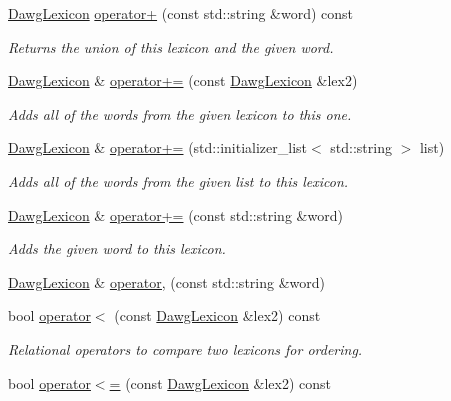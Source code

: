 \begin{DoxyCompactItemize}
\mbox{\hyperlink{classDawgLexicon}{Dawg\+Lexicon}} \mbox{\hyperlink{classDawgLexicon_a218cb40b0674a3db9a362e5b878f7bce}{operator+}} (const std\+::string \&word) const
\begin{DoxyCompactList}\small\item\em Returns the union of this lexicon and the given word. \end{DoxyCompactList}\item 
\mbox{\hyperlink{classDawgLexicon}{Dawg\+Lexicon}} \& \mbox{\hyperlink{classDawgLexicon_a4f69eb7a84edf9a91861e7083305e501}{operator+=}} (const \mbox{\hyperlink{classDawgLexicon}{Dawg\+Lexicon}} \&lex2)
\begin{DoxyCompactList}\small\item\em Adds all of the words from the given lexicon to this one. \end{DoxyCompactList}\item 
\mbox{\hyperlink{classDawgLexicon}{Dawg\+Lexicon}} \& \mbox{\hyperlink{classDawgLexicon_a30565b5b4fdd5efeb9c11fb1943a1d90}{operator+=}} (std\+::initializer\+\_\+list$<$ std\+::string $>$ list)
\begin{DoxyCompactList}\small\item\em Adds all of the words from the given list to this lexicon. \end{DoxyCompactList}\item 
\mbox{\hyperlink{classDawgLexicon}{Dawg\+Lexicon}} \& \mbox{\hyperlink{classDawgLexicon_a8d7fe415402649e86e5ccbb3738d358e}{operator+=}} (const std\+::string \&word)
\begin{DoxyCompactList}\small\item\em Adds the given word to this lexicon. \end{DoxyCompactList}\item 
\mbox{\hyperlink{classDawgLexicon}{Dawg\+Lexicon}} \& \mbox{\hyperlink{classDawgLexicon_ad749b5a8bca43259350ee643e152c2d8}{operator,}} (const std\+::string \&word)
\item 
bool \mbox{\hyperlink{classDawgLexicon_aa7c66db17666a22697ec8076716c3680}{operator$<$}} (const \mbox{\hyperlink{classDawgLexicon}{Dawg\+Lexicon}} \&lex2) const
\begin{DoxyCompactList}\small\item\em Relational operators to compare two lexicons for ordering. \end{DoxyCompactList}\item 
bool \mbox{\hyperlink{classDawgLexicon_a054b62f48d59746ad45e92c1b278463e}{operator$<$=}} (const \mbox{\hyperlink{classDawgLexicon}{Dawg\+Lexicon}} \&lex2) const

\end{DoxyCompactItemize}
